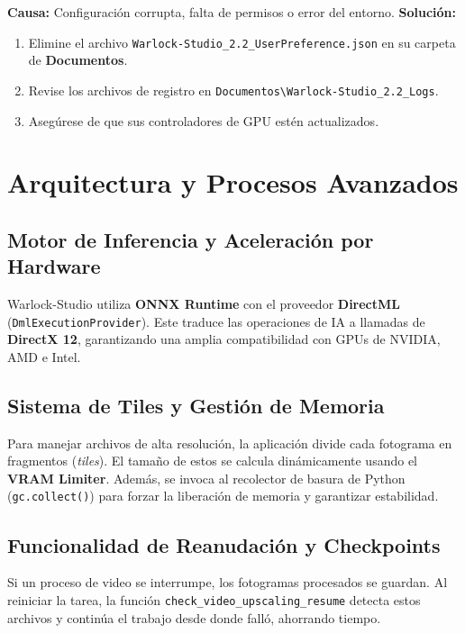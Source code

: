 \documentclass[11pt, a4paper]{article}
\newcommand{\inlinecode}[1]{\colorbox{WarlockLightGray}{\small\texttt{#1}}}
\begin{document}
\begin{description}[leftmargin=*, style=nextline, itemsep=0.8em]
    \item[\faQuestionCircle\ Problema: La aplicación no se abre]
        \textbf{Causa:} Configuración corrupta, falta de permisos o error del entorno.
        \textbf{Solución:}
        \begin{enumerate}[nosep, leftmargin=*]
            \item Elimine el archivo \inlinecode{Warlock-Studio_2.2_UserPreference.json} en su carpeta de \textbf{Documentos}.
            \item Revise los archivos de registro en \texttt{Documentos\textbackslash Warlock-Studio_2.2_Logs}.
            \item Asegúrese de que sus controladores de GPU estén actualizados.
        \end{enumerate}
\end{description}

\section{Arquitectura y Procesos Avanzados}

\subsection{Motor de Inferencia y Aceleración por Hardware}
Warlock-Studio utiliza \textbf{ONNX Runtime} con el proveedor \textbf{DirectML} (\inlinecode{DmlExecutionProvider}). Este traduce las operaciones de IA a llamadas de \textbf{DirectX 12}, garantizando una amplia compatibilidad con GPUs de NVIDIA, AMD e Intel.

\subsection{Sistema de Tiles y Gestión de Memoria}
Para manejar archivos de alta resolución, la aplicación divide cada fotograma en fragmentos (\textit{tiles}). El tamaño de estos se calcula dinámicamente usando el \textbf{VRAM Limiter}. Además, se invoca al recolector de basura de Python (\inlinecode{gc.collect()}) para forzar la liberación de memoria y garantizar estabilidad.

\subsection{Funcionalidad de Reanudación y Checkpoints}
Si un proceso de video se interrumpe, los fotogramas procesados se guardan. Al reiniciar la tarea, la función \inlinecode{check\_video\_upscaling\_resume} detecta estos archivos y continúa el trabajo desde donde falló, ahorrando tiempo.
\end{document}
